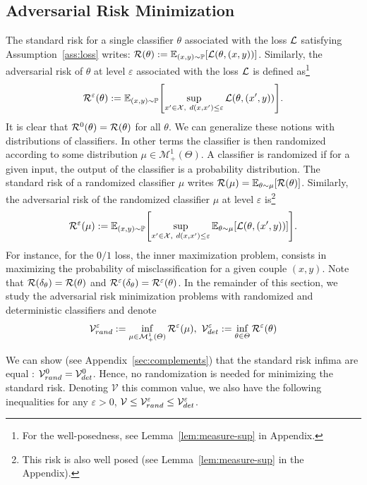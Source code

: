 \subsection{Adversarial Risk Minimization}
The standard risk for a single classifier $\theta$ associated with the loss $\mathcal{L}$ satisfying Assumption~\ref{ass:loss} writes: $\risk(\theta):=\mathbb{E}_{(x,y)\sim \PP}\left[\loss(\theta,(x,y))\right]$. Similarly, the adversarial risk of $\theta$ at level $\varepsilon$ associated with the loss $\mathcal{L}$ is defined as\footnote{For the well-posedness, see Lemma~\ref{lem:measure-sup} in Appendix.}
\begin{align*}
    \risk^\varepsilon(\theta):=\mathbb{E}_{(x,y)\sim \PP}\left[\sup_{x'\in\mathcal{X},~d(x,x')\leq\varepsilon}\loss(\theta,(x',y))\right].
\end{align*}
 It is clear that $\mathcal{R}^0(\theta) =\mathcal{R}(\theta)$ for all $\theta$. We can generalize these notions with distributions of classifiers. In other terms the classifier is then randomized according to some distribution $\mu\in\mathcal{M}^1_+(\Theta)$. A classifier is randomized if for a given input, the output of the classifier is a probability distribution.
 The standard risk of a randomized classifier $\mu$ writes $\risk(\mu) = \mathbb{E}_{\theta\sim\mu}\left[\risk (\theta)\right]$. Similarly, the adversarial risk of the randomized classifier $\mu$ at level $\varepsilon$ is\footnote{This risk is also well posed (see Lemma~\ref{lem:measure-sup} in the Appendix).}
\begin{align*}
    \risk^\varepsilon(\mu):=\mathbb{E}_{(x,y)\sim \PP}\left[\sup_{x'\in\mathcal{X},~d(x,x')\leq\varepsilon}\mathbb{E}_{\theta\sim\mu}\left[\loss(\theta,(x',y))\right]\right].
\end{align*}
For instance, for the $0/1$ loss, the inner maximization problem, consists in maximizing the probability of misclassification for a given couple $(x,y)$. Note that $\mathcal{R}(\delta_\theta)=\mathcal{R}(\theta)$ and $\mathcal{R}^\varepsilon(\delta_\theta)=\mathcal{R}^\varepsilon(\theta)$. In the remainder of this section, we study the adversarial risk minimization problems with randomized and deterministic classifiers and denote
\begin{align}
\label{eq:advriskmin}
    \mathcal{V}_{rand}^\varepsilon:=\inf_{\mu\in\mathcal{M}^1_+(\Theta)} \mathcal{R}^\varepsilon(\mu),~\mathcal{V}_{det}^\varepsilon:=\inf_{\theta\in\Theta} \mathcal{R}^\varepsilon(\theta)
\end{align}

\begin{rmq}
We can show (see Appendix~\ref{sec:complements}) that the standard risk infima are equal :  $\mathcal{V}_{rand}^0=\mathcal{V}_{det}^0$. Hence, no randomization is needed for minimizing the standard risk. Denoting $\mathcal{V}$ this common value, we also have the following inequalities for any $\varepsilon>0$, $\mathcal{V}\leq \mathcal{V}_{rand}^\varepsilon\leq \mathcal{V}_{det}^\varepsilon$.
\end{rmq}




